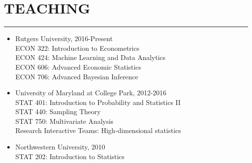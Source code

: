 \documentclass[11pt]{article}
\begin{document}
\section*{TEACHING}
\hrule
\hfill


\begin{itemize}
\item Rutgers University, 2016-Present\\
ECON 322:  Introduction to Econometrics\\
ECON 424:  Machine Learning and Data Analytics\\
ECON 606: Advanced Economic Statistics\\
ECON 706: Advanced Bayesian Inference


\item University of Maryland at College Park, 2012-2016\\
STAT 401: Introduction to Probability and Statistics II \\
  STAT 440: Sampling Theory\\
  STAT 750: Multivariate Analysis\\
 Research Interactive Teams: High-dimensional statistics
\item
Northwestern University, 2010\\
STAT 202: Introduction to Statistics
\end{itemize}








\end{document}
